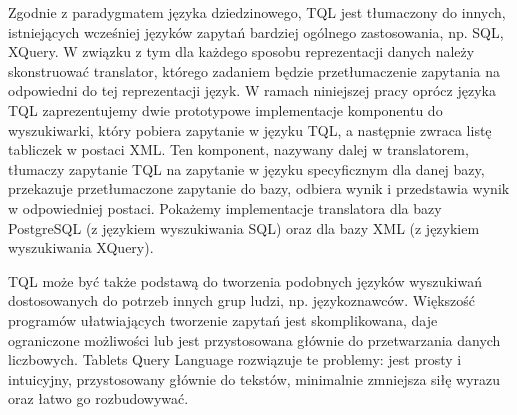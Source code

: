 Zgodnie z paradygmatem języka dziedzinowego, TQL jest tłumaczony do innych, istniejących wcześniej języków zapytań bardziej ogólnego zastosowania, np. SQL, XQuery.
W związku z tym dla każdego sposobu reprezentacji danych należy skonstruować translator, 
którego zadaniem będzie przetłumaczenie zapytania na odpowiedni do tej reprezentacji język. 
W ramach niniejszej pracy oprócz języka TQL zaprezentujemy dwie prototypowe implementacje komponentu do wyszukiwarki, który pobiera zapytanie w języku TQL, a następnie zwraca listę tabliczek w postaci XML.
Ten komponent, nazywany dalej w translatorem, tłumaczy zapytanie TQL na zapytanie w języku specyficznym dla danej bazy, przekazuje przetłumaczone zapytanie do bazy, odbiera wynik i przedstawia wynik w odpowiedniej postaci. Pokażemy implementacje translatora dla bazy PostgreSQL (z językiem wyszukiwania SQL) oraz dla bazy XML (z językiem wyszukiwania XQuery).






TQL może być także podstawą do tworzenia podobnych języków wyszukiwań dostosowanych do potrzeb innych grup ludzi, np. językoznawców.
Większość programów ułatwiających tworzenie zapytań jest skomplikowana, daje ograniczone możliwości lub jest przystosowana głównie do przetwarzania danych liczbowych. Tablets Query Language rozwiązuje te problemy: jest prosty i intuicyjny, przystosowany głównie do tekstów, minimalnie zmniejsza siłę wyrazu oraz łatwo go rozbudowywać. 



